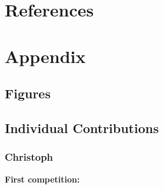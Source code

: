 \documentclass[a4paper]{article}
\begin{document}
\section{References}


\section*{Appendix}


\subsection*{Figures}



\subsection*{Individual Contributions}


\subsubsection*{Christoph}

\textbf{First competition:}
\end{document}
